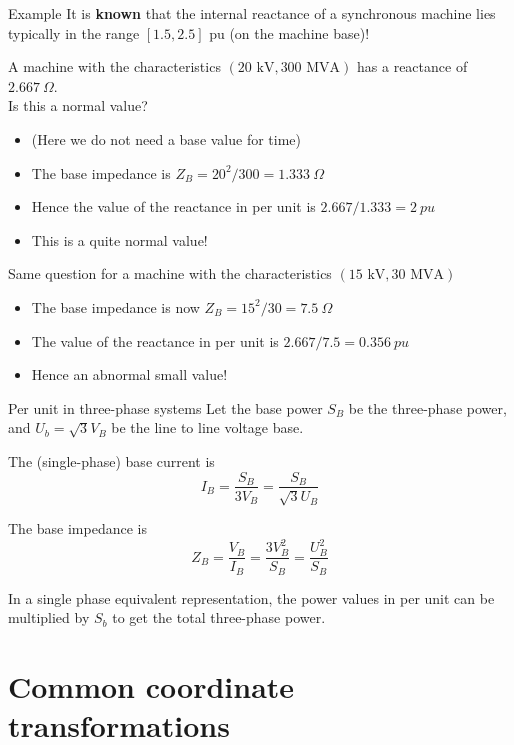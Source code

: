 \begin{frame}[allowframebreaks]{Example}
    It is \textbf{known} that the internal reactance of a synchronous machine lies typically in the range $[1.5, 2.5] \text{ pu}$ (on the machine base)! 
     
    A machine with the characteristics $(20 \text{ kV}, 300 \text{ MVA})$ has a reactance of $2.667 \ \Omega$.\\ Is this a normal value?
    \begin{itemize}
        \item (Here we do not need a base value for time)
        \item The base impedance is $Z_B = 20^2/300 = 1.333 \ \Omega$
        \item Hence the value of the reactance in per unit is $2.667/1.333 = 2 \ pu$
        \item This is a quite normal value!
    \end{itemize}
    Same question for a machine with the characteristics $(15 \text{ kV}, 30 \text{ MVA})$
    \begin{itemize}
        \item The base impedance is now $Z_B=15^2/30 = 7.5 \ \Omega$
        \item The value of the reactance in per unit is $2.667/7.5 = 0.356 \ pu$
        \item Hence an abnormal small value!
    \end{itemize}
\end{frame}

\begin{frame}{Per unit in three-phase systems}
    Let the base power $S_B$ be the three-phase power, and $U_b=\sqrt{3}V_B$ be the line to line voltage base.

    The (single-phase) base current is $$I_B = \frac{S_B}{3V_B} = \frac{S_B}{\sqrt{3}U_B}$$

    The base impedance is $$Z_B = \frac{V_B}{I_B} = \frac{3V^2_B}{S_B} = \frac{U_B^2}{S_B}$$

    In a single phase equivalent representation, the power values in per unit can be multiplied by $S_b$ to get the total three-phase power.
\end{frame}
  

\section{Common coordinate transformations}

